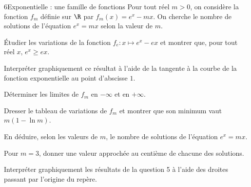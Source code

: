 \begin{exoBac}{6}{Exponentielle : une famille de fonctions}
Pour tout réel $m>0$, on considère la fonction $f_m$ définie sur $\R$ par $f_m(x)=e^{x}-mx$. On cherche le nombre de solutions de
l'équation $e^{x}=mx$ selon la valeur de $m$.
\begin{questions}
  \item Étudier les variations de la fonction $f_e:x\mapsto e^{x}-ex$ et montrer que, pour tout réel $x$, $e^{x}\geq ex$.
  \item Interpréter graphiquement ce résultat à l'aide de la tangente à la courbe de la fonction exponentielle au point d'abscisse $1$.
\end{questions}
\begin{questions}[resume]
  \item Déterminer les limites de $f_m$ en $-\infty$ et en $+\infty$.
  \item Dresser le tableau de variations de $f_m$ et montrer que son minimum vaut $m(1-\ln m)$.
  \item En déduire, selon les valeurs de $m$, le nombre de solutions de l'équation $e^{x}=mx$.
  \item Pour $m=3$, donner une valeur approchée au centième de chacune des solutions.
  \item Interpréter graphiquement les résultats de la question 5 à l'aide des droites passant par l'origine du repère.
\end{questions}
\end{exoBac}

